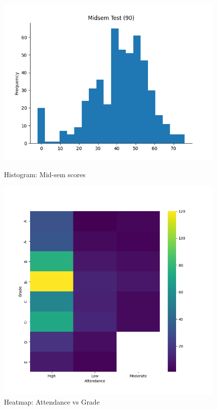 \begin{figure}[htbp]
    \centering
    \begin{minipage}[b]{0.45\textwidth}
        \centering
        \includegraphics[width=\textwidth]{images/data_midsem.png}
        \caption*{Histogram: Mid-sem scores}
        \label{fig:image1}
    \end{minipage}
    \hfill
    \begin{minipage}[b]{0.45\textwidth}
        \centering
    \includegraphics[width=\textwidth]{images/data_attendance_vs_grade.png}
        \caption*{Heatmap: Attendance vs Grade}
        \label{fig:image2}
    \end{minipage}
    \label{fig:overall}
\end{figure}


